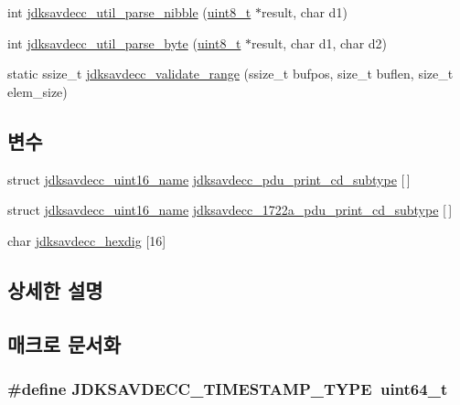 \begin{DoxyCompactItemize}
int \hyperlink{group__util_ga8e6b4707f16031adcb7ae2f983e908ee}{jdksavdecc\+\_\+util\+\_\+parse\+\_\+nibble} (\hyperlink{stdint_8h_aba7bc1797add20fe3efdf37ced1182c5}{uint8\+\_\+t} $\ast$result, char d1)
\item 
int \hyperlink{group__util_ga82a47aacd3de4b522a4ac6a52d72e17e}{jdksavdecc\+\_\+util\+\_\+parse\+\_\+byte} (\hyperlink{stdint_8h_aba7bc1797add20fe3efdf37ced1182c5}{uint8\+\_\+t} $\ast$result, char d1, char d2)
\item 
static ssize\+\_\+t \hyperlink{group__util_ga9c02bdfe76c69163647c3196db7a73a1}{jdksavdecc\+\_\+validate\+\_\+range} (ssize\+\_\+t bufpos, size\+\_\+t buflen, size\+\_\+t elem\+\_\+size)
\end{DoxyCompactItemize}
\subsection*{변수}
\begin{DoxyCompactItemize}
\item 
struct \hyperlink{structjdksavdecc__uint16__name}{jdksavdecc\+\_\+uint16\+\_\+name} \hyperlink{group__util_ga6e3c1bc9c00f03c08f1af13033015aa0}{jdksavdecc\+\_\+pdu\+\_\+print\+\_\+cd\+\_\+subtype} \mbox{[}$\,$\mbox{]}
\item 
struct \hyperlink{structjdksavdecc__uint16__name}{jdksavdecc\+\_\+uint16\+\_\+name} \hyperlink{group__util_ga4c61ac45e790648ccc89745c4c5f2155}{jdksavdecc\+\_\+1722a\+\_\+pdu\+\_\+print\+\_\+cd\+\_\+subtype} \mbox{[}$\,$\mbox{]}
\item 
char \hyperlink{group__util_ga798c728bf6289d035258b922bc673618}{jdksavdecc\+\_\+hexdig} \mbox{[}16\mbox{]}
\end{DoxyCompactItemize}


\subsection{상세한 설명}


\subsection{매크로 문서화}
\subsubsection[{\texorpdfstring{J\+D\+K\+S\+A\+V\+D\+E\+C\+C\+\_\+\+T\+I\+M\+E\+S\+T\+A\+M\+P\+\_\+\+T\+Y\+PE}{JDKSAVDECC_TIMESTAMP_TYPE}}]{\setlength{\rightskip}{0pt plus 5cm}\#define J\+D\+K\+S\+A\+V\+D\+E\+C\+C\+\_\+\+T\+I\+M\+E\+S\+T\+A\+M\+P\+\_\+\+T\+Y\+PE~{\bf uint64\+\_\+t}}\hypertarget{group__util_gadd24ee5a8dde672bc6f9bdf27b8f481e}{}\label{group__util_gadd24ee5a8dde672bc6f9bdf27b8f481e}


